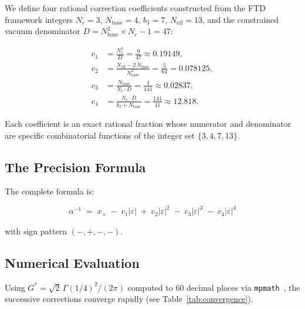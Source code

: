 \documentclass[11pt,twoside]{article}
\theoremstyle{remark}
\newcommand{\eps}{\varepsilon}
\newcommand{\Gstar}{G^{*}}
\newcommand{\xp}{x_{+}}
\newcommand{\inv}{\alpha^{-1}}
\begin{document}
We define four rational correction coefficients constructed from the FTD framework integers $N_c = 3$, $N_{\mathrm{base}} = 4$, $b_3 = 7$, $N_{\mathrm{eff}} = 13$, and the constrained vacuum denominator $D = N_{\mathrm{base}}^2 \times N_c - 1 = 47$:

\begin{align}
    c_1 &= \frac{N_c^2}{D} = \frac{9}{47} \approx 0.19149, \label{eq:c1}\\[6pt]
    c_2 &= \frac{N_{\mathrm{eff}} - 2\,N_{\mathrm{base}}}{N_{\mathrm{base}}^3} = \frac{5}{64} = 0.078125, \label{eq:c2}\\[6pt]
    c_3 &= \frac{N_{\mathrm{base}}}{N_c \cdot D} = \frac{4}{141} \approx 0.02837, \label{eq:c3}\\[6pt]
    c_4 &= \frac{N_c \cdot D}{b_3 + N_{\mathrm{base}}} = \frac{141}{11} \approx 12.818. \label{eq:c4}
\end{align}

Each coefficient is an exact rational fraction whose numerator and denominator are specific combinatorial functions of the integer set $\{3, 4, 7, 13\}$.


\subsection{The Precision Formula}
\label{sec:precision_formula}

The complete formula is:

\begin{equation}
\label{eq:main}
    \boxed{\;\inv \;=\; \xp \;-\; c_1|\eps| \;+\; c_2|\eps|^2 \;-\; c_3|\eps|^3 \;-\; c_4|\eps|^4\;}
\end{equation}

\noindent with sign pattern $(-, +, -, -)$.


\subsection{Numerical Evaluation}
\label{sec:evaluation}

Using $\Gstar = \sqrt{2}\,\Gamma(1/4)^2/(2\pi)$ computed to 60 decimal places via \texttt{mpmath}~\cite{mpmath}, the successive corrections converge rapidly (see Table~\ref{tab:convergence}).
\end{document}
